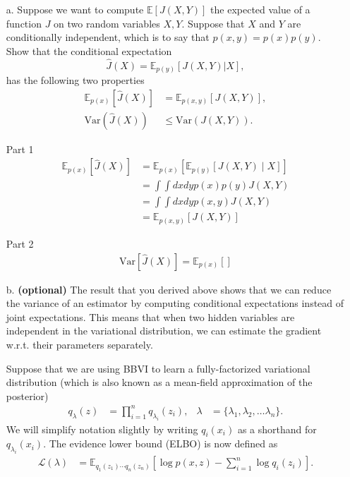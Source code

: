 \documentclass [12pt]{article}
\newcommand{\E}{\ensuremath{\mathbb{E}}}
\begin{document}
\begin{itemize}
\item[a.] Suppose we want to compute $\E\left[ J(X,Y) \right]$ the expected value of a function $J$ on two random variables $X, Y$. Suppose that $X$ and $Y$ are conditionally independent, which is to say that $p(x,y) = p(x)p(y)$. Show that the conditional expectation 
\[
	\hat{J}(X) = \E_{p(y)}\left[ J(X,Y) | X \right],
\]
has the following two properties
\begin{align*}
	\E_{p(x)}\left[ \hat{J}(X)\right] 
    &= \E_{p(x,y)}\left[J(X,Y) \right],
    \\
    \text{Var}(\hat{J}(X)) 
    &\leq \text{Var}(J(X,Y)).
\end{align*}

Part 1
\begin{align*}
   \E_{p(x)}\left[ \hat{J}(X)\right] &= \E_{p(x)}\left[ \E_{p(y)}\left[ J(X, Y )\mid X \right]\right] \\
   &= \int \int dx dy p(x) p(y) J(X,Y) \\
   &= \int \int dx dy p(x, y) J(X,Y) \\
   &= \E_{p(x,y)}\left[J(X,Y) \right]
\end{align*}

Part 2 
\begin{align*}
    \textrm{Var}\left[ \hat{J}(X) \right] = \E_{p(x)} \left[ \right]
\end{align*}

\item[b.] \textbf{(optional)} The result that you derived above shows that we can reduce the variance of an estimator by computing conditional expectations instead of joint expectations. This means that when two hidden variables are independent in the variational distribution, we can estimate the gradient w.r.t. their parameters separately.

Suppose that we are using BBVI to learn a fully-factorized variational distribution (which is also known as a mean-field approximation of the posterior) 
\begin{align*} 
	q_{\lambda}(z) 
    &= 
    \prod_{i=1}^{n}q_{\lambda_{i}}(z_{i}),
   &
   \lambda 
   &= 
   \{ 
     \lambda_{1}, \lambda_{2}, \ldots \lambda_{n} 
   \}.
\end{align*}
We will simplify notation slightly by writing $q_{i}(x_i)$ as a shorthand for $q_{\lambda_{i}}(x_i)$. The evidence lower bound (ELBO) is now defined as
\begin{align}
	\mathcal{L}(\lambda)
	&= 
    \E_{q_{1}(z_{1})\cdots q_{n}(z_{n})}
    \left[
    	\log p(x,z) - \sum_{i=1}^{n} \log q_{i}(z_{i}) 
    \right].
\end{align}


\end{itemize}
\end{document}
